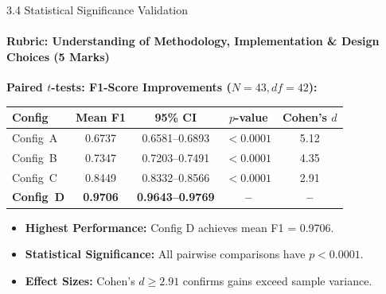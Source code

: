 \documentclass[aspectratio=169, 11pt]{beamer}
\begin{document}
\begin{frame}{3.4 Statistical Significance Validation}
    \framesubtitle{Rubric: Understanding of Methodology, Implementation \& Design Choices (5 Marks)}
    \centering
    \textbf{Paired $t$-tests: F1-Score Improvements ($N=43, df=42$):}
    \vspace{0.2cm}
    \begin{table}
        \centering
        \small
        \renewcommand{\arraystretch}{1.1}
        \begin{tabular}{lcccc}
            \toprule
            \textbf{Config} & \textbf{Mean F1} & \textbf{95\% CI} & \textbf{$p$-value} & \textbf{Cohen's $d$} \\
            \midrule
            Config~A & 0.6737 & 0.6581--0.6893 & $< 0.0001$ & 5.12 \\
            Config~B & 0.7347 & 0.7203--0.7491 & $< 0.0001$ & 4.35 \\
            Config~C & 0.8449 & 0.8332--0.8566 & $< 0.0001$ & 2.91 \\
            \textbf{Config~D} & \textbf{0.9706} & \textbf{0.9643--0.9769} & \textbf{--} & \textbf{--} \\
            \bottomrule
        \end{tabular}
    \end{table}
    \vspace{0.5cm}
    \begin{itemize}
        \item \textbf{Highest Performance:} Config D achieves mean F1 = 0.9706.
        \item \textbf{Statistical Significance:} All pairwise comparisons have $p < 0.0001$.
        \item \textbf{Effect Sizes:} Cohen's $d \geq 2.91$ confirms gains exceed sample variance.
    \end{itemize}
\end{frame}

\end{document}
